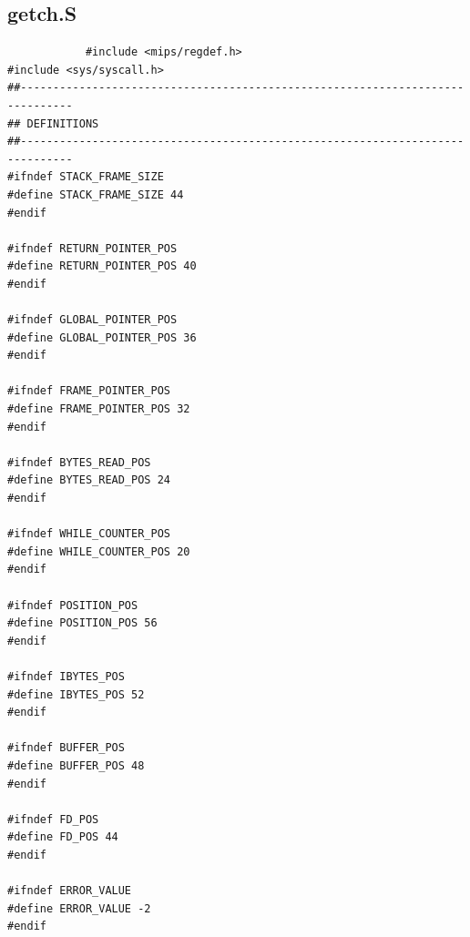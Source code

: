 \documentclass[a4paper,10pt]{article}
\begin{document}
        \subsection{getch.S}
            \begin{lstlisting}
            #include <mips/regdef.h>
#include <sys/syscall.h>
##------------------------------------------------------------------------------
## DEFINITIONS
##------------------------------------------------------------------------------
#ifndef STACK_FRAME_SIZE
#define STACK_FRAME_SIZE 44
#endif

#ifndef RETURN_POINTER_POS
#define RETURN_POINTER_POS 40
#endif

#ifndef GLOBAL_POINTER_POS
#define GLOBAL_POINTER_POS 36
#endif

#ifndef FRAME_POINTER_POS
#define FRAME_POINTER_POS 32
#endif

#ifndef BYTES_READ_POS
#define BYTES_READ_POS 24
#endif

#ifndef WHILE_COUNTER_POS
#define WHILE_COUNTER_POS 20
#endif

#ifndef POSITION_POS
#define POSITION_POS 56
#endif

#ifndef IBYTES_POS
#define IBYTES_POS 52
#endif

#ifndef BUFFER_POS
#define BUFFER_POS 48
#endif

#ifndef FD_POS
#define FD_POS 44
#endif

#ifndef ERROR_VALUE
#define ERROR_VALUE -2
#endif


\end{lstlisting}
\end{document}
